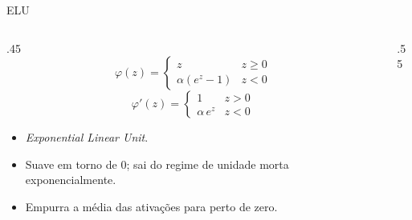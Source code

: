 \documentclass[aspectratio=169,xcolor=dvipsnames]{beamer}
\begin{document}
  \begin{frame}{ELU}
    \begin{columns}
      \begin{column}{.45\linewidth}
        \[
          \varphi(z) =
            \begin{cases}
              z & z\ge 0 \\
              \alpha(e^{z}-1) & z<0
            \end{cases}
        \]
        \[
          \varphi'(z) =
            \begin{cases}
              1 & z>0 \\
              \alpha\,e^{z} & z<0
            \end{cases}
        \]
        \begin{itemize}
          \item \textit{Exponential Linear Unit}.
          \item Suave em torno de 0; sai do regime de unidade morta exponencialmente.
          \item Empurra a média das ativações para perto de zero.
        \end{itemize}
      \end{column}
      \begin{column}{.55\linewidth}
        \centering
      \end{column}
    \end{columns}
  \end{frame}
\end{document}
